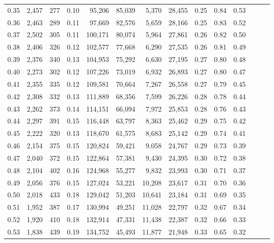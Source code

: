 \begin{tabular}{rrrrrrrrrrrrrr}
0.35 &  2,457 &  277 &  0.10 &   95,206 &   85,039 &   5,370 &  28,455 &  0.25 &  0.84 &      0.53 \\
0.36 &  2,463 &  289 &  0.11 &   97,669 &   82,576 &   5,659 &  28,166 &  0.25 &  0.83 &      0.52 \\
0.37 &  2,502 &  305 &  0.11 &  100,171 &   80,074 &   5,964 &  27,861 &  0.26 &  0.82 &      0.50 \\
0.38 &  2,406 &  326 &  0.12 &  102,577 &   77,668 &   6,290 &  27,535 &  0.26 &  0.81 &      0.49 \\
0.39 &  2,376 &  340 &  0.13 &  104,953 &   75,292 &   6,630 &  27,195 &  0.27 &  0.80 &      0.48 \\
0.40 &  2,273 &  302 &  0.12 &  107,226 &   73,019 &   6,932 &  26,893 &  0.27 &  0.80 &      0.47 \\
0.41 &  2,355 &  335 &  0.12 &  109,581 &   70,664 &   7,267 &  26,558 &  0.27 &  0.79 &      0.45 \\
0.42 &  2,308 &  332 &  0.13 &  111,889 &   68,356 &   7,599 &  26,226 &  0.28 &  0.78 &      0.44 \\
0.43 &  2,262 &  373 &  0.14 &  114,151 &   66,094 &   7,972 &  25,853 &  0.28 &  0.76 &      0.43 \\
0.44 &  2,297 &  391 &  0.15 &  116,448 &   63,797 &   8,363 &  25,462 &  0.29 &  0.75 &      0.42 \\
0.45 &  2,222 &  320 &  0.13 &  118,670 &   61,575 &   8,683 &  25,142 &  0.29 &  0.74 &      0.41 \\
0.46 &  2,154 &  375 &  0.15 &  120,824 &   59,421 &   9,058 &  24,767 &  0.29 &  0.73 &      0.39 \\
0.47 &  2,040 &  372 &  0.15 &  122,864 &   57,381 &   9,430 &  24,395 &  0.30 &  0.72 &      0.38 \\
0.48 &  2,104 &  402 &  0.16 &  124,968 &   55,277 &   9,832 &  23,993 &  0.30 &  0.71 &      0.37 \\
0.49 &  2,056 &  376 &  0.15 &  127,024 &   53,221 &  10,208 &  23,617 &  0.31 &  0.70 &      0.36 \\
0.50 &  2,018 &  433 &  0.18 &  129,042 &   51,203 &  10,641 &  23,184 &  0.31 &  0.69 &      0.35 \\
0.51 &  1,952 &  387 &  0.17 &  130,994 &   49,251 &  11,028 &  22,797 &  0.32 &  0.67 &      0.34 \\
0.52 &  1,920 &  410 &  0.18 &  132,914 &   47,331 &  11,438 &  22,387 &  0.32 &  0.66 &      0.33 \\
0.53 &  1,838 &  439 &  0.19 &  134,752 &   45,493 &  11,877 &  21,948 &  0.33 &  0.65 &      0.32 \\

\end{tabular}
